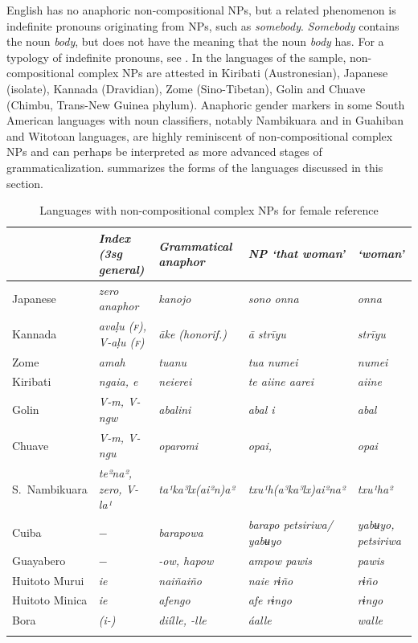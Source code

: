\documentclass[output=collectionpaper]{langsci/langscibook}
\begin{document}
English has no anaphoric non-compositional NPs, but a related phenomenon is indefinite pronouns originating from NPs, such as \textit{somebody}. \textit{Somebody} contains the noun \textit{body}, but does not have the meaning that the noun \textit{body} has. For a typology of indefinite pronouns, see \citet{Haspelmath1997}. In the languages of the sample, non-compositional complex NPs are attested in Kiribati (Austronesian), Japanese (isolate), Kannada (Dravidian), Zome (Sino-Tibetan), Golin and Chuave (Chimbu, Trans-New Guinea phylum). Anaphoric gender markers in some South American languages with noun classifiers, notably Nambikuara and in Guahiban and Witotoan languages, are highly reminiscent of non-compositional complex NPs and can perhaps be interpreted as more advanced stages of grammaticalization.  summarizes the forms of the languages discussed in this section.

\begin{table}
\begin{tabularx}{\textwidth}{Q>{\itshape}X>{\itshape}X>{\itshape}X>{\itshape}X}
\lsptoprule
& \normalfont	Index (3sg general)	&	\normalfont Grammatical anaphor	&	\normalfont NP ‘that woman’	&	\normalfont ‘woman’	\\
\midrule
Japanese	&	\normalfont zero anaphor	&	kanojo	&	sono onna	&	onna	\\
Kannada	&	avaḷu {\normalfont (\scshape f)}, {\normalfont V}-aḷu {\normalfont (\scshape f)}	&	āke \normalfont (honorif.)	&	ā strīyu	&	strīyu	\\
Zome	&	amah	&	tuanu	&	tua numei	&	numei	\\
Kiribati	&	ngaia, e	&	neierei	&	te aiine aarei	&	aiine	\\
Golin	&	{\normalfont V}-m, {\normalfont V}-ngw	&	abalini	&	abal i	&	abal	\\
Chuave	&	{\normalfont V}-m, {\normalfont V}-ngu	&	oparomi	&	opai, 	&	opai	\\
S.~Nambikuara	&	te²na², {\normalfont zero}, {\normalfont V}-la¹	&	ta¹ka³lx(ai²n)a²	&	txu¹h(a³ka³lx)ai²na²	&	txu¹ha²	\\
Cuiba	&	$-$	&	barapowa	&	barapo petsiriwa/ yabʉyo	&	yabʉyo, petsiriwa	\\
Guayabero	&	$-$ 	&	-ow, hapow	&	ampow pawis	&	pawis	\\
Huitoto Murui	&	ie	&	naiñaiño	&	naie rɨño	&	rɨño	\\
Huitoto Minica	&	ie	&	afengo	&	afe rɨngo	&	rɨngo	\\
Bora	&	(i-)	&	diílle, -lle	&	áalle	&	walle	\\
\lspbottomrule
\end{tabularx}
\caption{Languages with non-compositional complex NPs for female reference}
\label{tab:BW:8}
\end{table}
\end{document}
